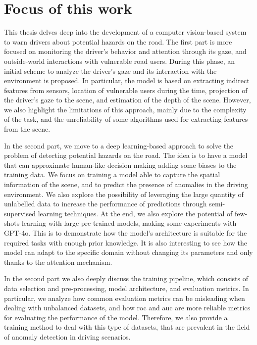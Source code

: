 \section{Focus of this work}
\label{sec:focus}
This thesis delves deep into the development of a computer vision-based system 
to warn drivers about potential hazards on the road. The first part is more 
focused on monitoring the driver's behavior and attention through its gaze, and 
outside-world interactions with vulnerable road users. During this phase, 
an initial scheme to analyze the driver's gaze and its interaction with the 
environment is proposed. In particular, the model is based on extracting indirect 
features from sensors, location of vulnerable users during the time, projection 
of the driver's gaze to the scene, and estimation of the depth of the scene.
However, we also highlight the limitations of this approach, mainly due to the 
complexity of the task, and the unreliability of some algorithms used for 
extracting features from the scene.

In the second part, we move to a deep learning-based approach to solve the 
problem of detecting potential hazards on the road. The idea is to have a model 
that can approximate human-like decision making adding some biases to the 
training data.
We focus on training a model 
able to capture the spatial information of the scene, and to predict the presence 
of anomalies in the driving environment. We also explore the possibility of 
leveraging the large quantity of unlabelled data to increase the performance 
of predictions through semi-supervised learning techniques.
At the end, we also explore the potential of few-shots learning with large 
pre-trained models, making some experiments with GPT-4o. This is to demonstrate 
how the model's architecture is suitable for the required tasks with enough 
prior knowledge. It is also interesting to see how the model can adapt to 
the specific domain without changing its parameters and only thanks to the 
attention mechanism.

In the second part we also deeply discuss the training pipeline, which consists 
of data selection and pre-processing, model architecture, and evaluation metrics.
In particular, we analyze how common evaluation metrics can be misleading 
when dealing with unbalanced datasets, and how \ac{roc} and \ac{auc} are 
more reliable metrics for evaluating the performance of the model.
Therefore, we also provide a training method to deal with this type of datasets,
that are prevalent in the field of anomaly detection in driving scenarios.



